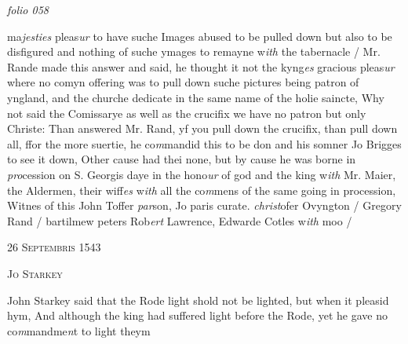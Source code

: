 \documentclass[12pt, a4paper]{book}
\begin{document}
\textit{folio 058}



				\marginpar[\vspace{0.5cm}{\textcolor{Gray}{n}}]{}
			
	
		\ifthenelse{\isodd{\thepage}}
		{\reversemarginpar}
		{\normalmarginpar}
		
ma\textit{jesties} pleas\textit{ur} to have suche Images abused to be
 pulled down but also to be disfigured and nothing
 of suche ymages to remayne w\textit{ith} the tabernacle / Mr.
 Rande made this answer and said, he thought it not
 the kyng\textit{es} gracious pleas\textit{ur }where no comyn offering
 was to pull down suche pictures being patron of
 yngland, and the churche dedicate in the same name
 of the holie saincte, Why not said the Comissarye as
 well as the crucifix we have no patron but only
 Christe: Than answered Mr. Rand, yf you pull
 down the crucifix, than pull down all, ffor the
 more suertie, he co\textit{m}mandid this to be don and his
		somner Jo Brigges to see it down, Other cause
 had thei none, but by cause he was borne in \textit{pro}cession
  on S. Georgis daye in the hono\textit{ur} of god and the king
		w\textit{ith} Mr. Maier, the Aldermen, their wiff\textit{es} w\textit{ith} all
 the co\textit{m}mens of the same going in procession, Witnes
		of this John Toffer \textit{par}son, Jo paris curate.\textit{ christ}ofer
			Ovyngton / Gregory Rand / bartilmew peters
		Rob\textit{ert }Lawrence, Edwarde Cotles w\textit{ith} moo /

 

            
            
               
				\begin{center} \begin{large} {\scshape 
               	26 Septembris 1543
               } \end{large} \end{center}
			
               
               	
				\begin{center}  {\scshape Jo Starkey}  \end{center}
			
               	
				\marginpar[\vspace{0.5cm}{\textcolor{Gray}{Ceremony}}]{}
			
               		
		\ifthenelse{\isodd{\thepage}}
		{\reversemarginpar}
		{\normalmarginpar}
		John Starkey said that the Rode light shold not be
  lighted, but when it pleasid hym, And although
 the king had suffered light before the Rode, yet he
 gave no co\textit{m}mandme\textit{n}t to light theym
               		
\end{document}
